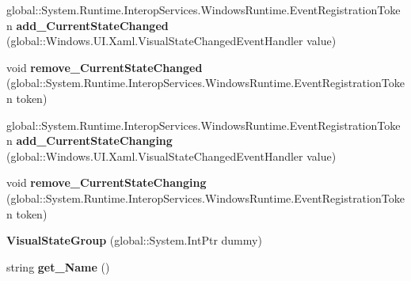 \begin{DoxyCompactItemize}
\item 
\mbox{\label{class_windows_1_1_u_i_1_1_xaml_1_1_visual_state_group_ab8a602f85c6928ad4dbda31b0fc3d4fc}} 
global\+::\+System.\+Runtime.\+Interop\+Services.\+Windows\+Runtime.\+Event\+Registration\+Token {\bfseries add\+\_\+\+Current\+State\+Changed} (global\+::\+Windows.\+U\+I.\+Xaml.\+Visual\+State\+Changed\+Event\+Handler value)
\item 
\mbox{\label{class_windows_1_1_u_i_1_1_xaml_1_1_visual_state_group_a51b022e4c0673d691c79a0f52b0ca0af}} 
void {\bfseries remove\+\_\+\+Current\+State\+Changed} (global\+::\+System.\+Runtime.\+Interop\+Services.\+Windows\+Runtime.\+Event\+Registration\+Token token)
\item 
\mbox{\label{class_windows_1_1_u_i_1_1_xaml_1_1_visual_state_group_a5fad6e8105f727dac7ab1a1b62568c0a}} 
global\+::\+System.\+Runtime.\+Interop\+Services.\+Windows\+Runtime.\+Event\+Registration\+Token {\bfseries add\+\_\+\+Current\+State\+Changing} (global\+::\+Windows.\+U\+I.\+Xaml.\+Visual\+State\+Changed\+Event\+Handler value)
\item 
\mbox{\label{class_windows_1_1_u_i_1_1_xaml_1_1_visual_state_group_aa287d3d7b305f3adad8090ce145b7729}} 
void {\bfseries remove\+\_\+\+Current\+State\+Changing} (global\+::\+System.\+Runtime.\+Interop\+Services.\+Windows\+Runtime.\+Event\+Registration\+Token token)
\item 
\mbox{\label{class_windows_1_1_u_i_1_1_xaml_1_1_visual_state_group_a8f7185159b1235d9b31261ec34a8498c}} 
{\bfseries Visual\+State\+Group} (global\+::\+System.\+Int\+Ptr dummy)
\item 
\mbox{\label{class_windows_1_1_u_i_1_1_xaml_1_1_visual_state_group_a2813cd015a01c964c6588672b185ac26}} 
string {\bfseries get\+\_\+\+Name} ()
\item 
\mbox{\label{class_windows_1_1_u_i_1_1_xaml_1_1_visual_state_group_a3738f82b20d960a14fdcfb568b232d49}} 

\end{DoxyCompactItemize}
